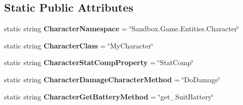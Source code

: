 \subsection*{Static Public Attributes}
\begin{DoxyCompactItemize}
\item 
\hypertarget{class_s_e_mod_a_p_i_internal_1_1_a_p_i_1_1_entity_1_1_sector_1_1_sector_object_1_1_character_entity_aab5d0717621f5ab963a684a22c9f6d3a}{}static string {\bfseries Character\+Namespace} = \char`\"{}Sandbox.\+Game.\+Entities.\+Character\char`\"{}\label{class_s_e_mod_a_p_i_internal_1_1_a_p_i_1_1_entity_1_1_sector_1_1_sector_object_1_1_character_entity_aab5d0717621f5ab963a684a22c9f6d3a}

\item 
\hypertarget{class_s_e_mod_a_p_i_internal_1_1_a_p_i_1_1_entity_1_1_sector_1_1_sector_object_1_1_character_entity_ab59d167a220f91d3061af9de697bafbf}{}static string {\bfseries Character\+Class} = \char`\"{}My\+Character\char`\"{}\label{class_s_e_mod_a_p_i_internal_1_1_a_p_i_1_1_entity_1_1_sector_1_1_sector_object_1_1_character_entity_ab59d167a220f91d3061af9de697bafbf}

\item 
\hypertarget{class_s_e_mod_a_p_i_internal_1_1_a_p_i_1_1_entity_1_1_sector_1_1_sector_object_1_1_character_entity_aba2af48d790a676abe16d9e409244822}{}static string {\bfseries Character\+Stat\+Comp\+Property} = \char`\"{}Stat\+Comp\char`\"{}\label{class_s_e_mod_a_p_i_internal_1_1_a_p_i_1_1_entity_1_1_sector_1_1_sector_object_1_1_character_entity_aba2af48d790a676abe16d9e409244822}

\item 
\hypertarget{class_s_e_mod_a_p_i_internal_1_1_a_p_i_1_1_entity_1_1_sector_1_1_sector_object_1_1_character_entity_a93030808e34097814e1522ae0d9f73a9}{}static string {\bfseries Character\+Damage\+Character\+Method} = \char`\"{}Do\+Damage\char`\"{}\label{class_s_e_mod_a_p_i_internal_1_1_a_p_i_1_1_entity_1_1_sector_1_1_sector_object_1_1_character_entity_a93030808e34097814e1522ae0d9f73a9}

\item 
\hypertarget{class_s_e_mod_a_p_i_internal_1_1_a_p_i_1_1_entity_1_1_sector_1_1_sector_object_1_1_character_entity_a1aea7065f8f60a088cb4e890adc1ad43}{}static string {\bfseries Character\+Get\+Battery\+Method} = \char`\"{}get\+\_\+\+Suit\+Battery\char`\"{}\label{class_s_e_mod_a_p_i_internal_1_1_a_p_i_1_1_entity_1_1_sector_1_1_sector_object_1_1_character_entity_a1aea7065f8f60a088cb4e890adc1ad43}


\end{DoxyCompactItemize}
